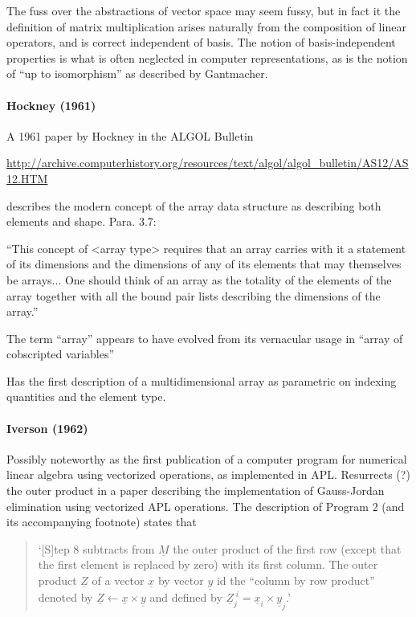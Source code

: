 The fuss over the abstractions of vector space may seem fussy, but in fact it the definition of matrix multiplication arises naturally from the composition of linear operators, and is correct independent of basis. The notion of basis-independent properties is what is often neglected in computer representations, as is the notion of ``up to isomorphism'' as described by Gantmacher.



\paragraph{Hockney (1961)}

A 1961 paper by Hockney in the ALGOL Bulletin

\url{http://archive.computerhistory.org/resources/text/algol/algol_bulletin/AS12/AS12.HTM}

describes the modern concept of the array data structure as describing
both elements and shape. Para. 3.7:

``This concept of <array type> requires that an array carries with it a
statement of its dimensions and the dimensions of any of its elements
that may themselves be arrays... One should think of an array as the
totality of the elements of the array together with all the bound pair
lists describing the dimensions of the array.''

The term ``array'' appears to have evolved from its vernacular usage in ``array of cobscripted variables''

Has the first description of a multidimensional array as parametric on indexing quantities and the element type.




\paragraph{Iverson (1962)~\cite{Iverson1962}}

Possibly noteworthy as the first publication of a computer program for numerical linear algebra using vectorized operations, as implemented in APL.
Resurrects (?) the outer product in a paper describing the implementation of Gauss-Jordan elimination using vectorized APL operations. The description of Program 2 (and its accompanying footnote) states that

\begin{quote}
`[S]tep 8 subtracts from $\underline{\textit{M}}$ the outer product of the first row (except that the first element is replaced by zero) with its first column. The outer product $\underline{\textit{Z}}$ of a vector $\underline{\textit{x}}$ by vector $\underline{\textit{y}}$ id the ``column by row product'' denoted by $\underline{\textit{Z}} \leftarrow \underline{\textit{x}} \times \underline{\textit{y}}$ and defined by $\underline{\textit{Z}}^{\; i}_j = \underline{\textit{x}}_i \times \underline{\textit{y}}_j$.'
\end{quote}

